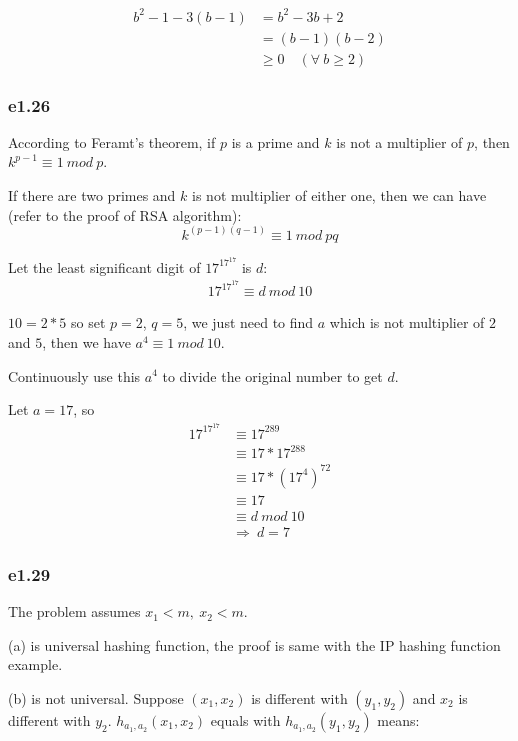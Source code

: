 \documentclass[11pt]{article}
\begin{document}
\begin{align}
  b^2-1-3(b-1) & = b^2-3b+2 \\
  & = (b-1)(b-2) \\
  & \ge 0\quad (\forall\ b \ge 2)
\end{align}

\subsubsection{e1.26}

According to Feramt's theorem, if $p$ is a prime and $k$ is not a
multiplier of $p$, then $k^{p-1} \equiv 1\ mod\ p$.

If there are two primes and $k$ is not multiplier of either one, then
we can have (refer to the proof of RSA algorithm):
\begin{equation}
  k^{(p-1)(q-1)} \equiv 1\ mod\ pq
\end{equation}

Let the least significant digit of $17^{17^{17}}$ is $d$:
\begin{align}
  17^{17^{17}} \equiv d\ mod\ 10
\end{align}

$10=2*5$ so set $p=2$, $q=5$, we just need to find $a$ which is not
multiplier of $2$ and $5$, then we have $a^4 \equiv 1\ mod\ 10$.

Continuously use this $a^4$ to divide the original number to get $d$.

Let $a=17$, so 
\begin{align}
  17^{17^{17}} & \equiv 17^{289} \\
  & \equiv 17*17^{288} \\
  & \equiv 17*(17^4)^{72} \\
  & \equiv 17 \\
  & \equiv d \ mod\ 10 \\
  & \Rightarrow\ d=7
\end{align}

\subsubsection{e1.29}

The problem assumes $x_1 < m,\ x_2 < m$.

(a) is universal hashing function, the proof is same with the IP
hashing function example.

(b) is not universal. Suppose $(x_1, x_2)$ is different with $(y_1,
y_2)$ and $x_2$ is different with $y_2$. $h_{a_1, a_2}(x_1, x_2)$
equals with $h_{a_1, a_2}(y_1, y_2)$ means:
\end{document}
